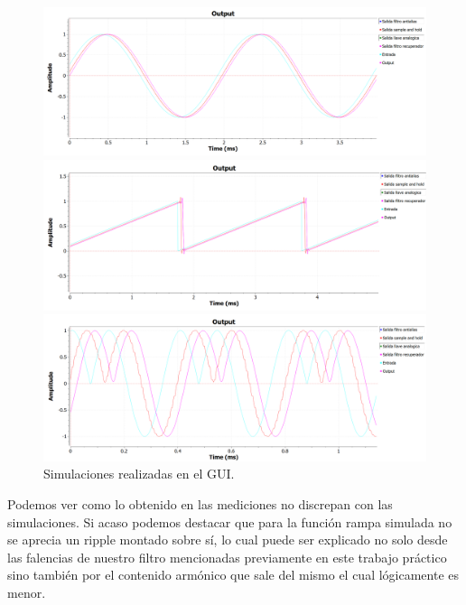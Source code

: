 \documentclass[../../ASSD_TP1_G7.tex]{subfiles}
\begin{document}
\begin{figure}[H]

\begin{centering}
\includegraphics[scale=0.5]{Imagenes/simulacion_syh_seno_a.PNG}
\par\end{centering}
\begin{centering}
\includegraphics[scale=0.5]{Imagenes/simulacion_syh_diente_a.PNG}
\par\end{centering}
\begin{centering}
\includegraphics[scale=0.5]{Imagenes/simulacion_syh_senoraro_a.PNG}\caption{Simulaciones realizadas en el GUI.}
\par\end{centering}
\end{figure}

Podemos ver como lo obtenido en las mediciones no discrepan con las
simulaciones. Si acaso podemos destacar que para la función rampa
simulada no se aprecia un ripple montado sobre sí, lo cual puede ser
explicado no solo desde las falencias de nuestro filtro mencionadas previamente
en este trabajo práctico sino también por el contenido armónico que sale del mismo el cual lógicamente es menor.
\end{document}
